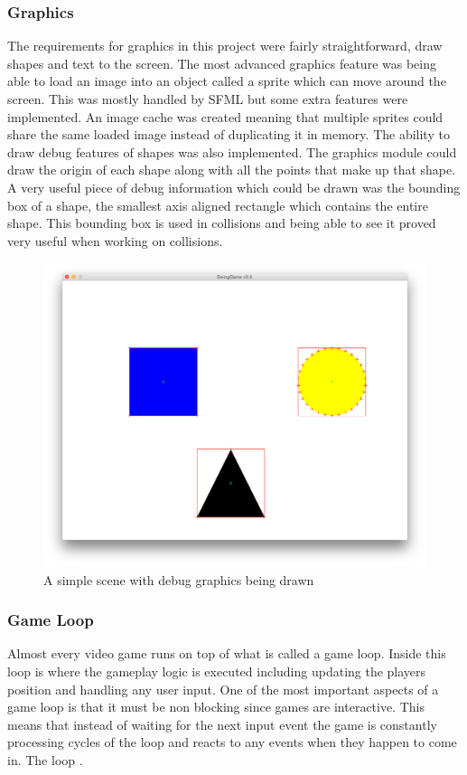 \documentclass[]{report}
\begin{document}
			\subsubsection{Graphics}
			The requirements for graphics in this project were fairly straightforward, draw shapes and text to the screen. The most advanced graphics feature was being able to load an image into an object called a sprite which can move around the screen. This was mostly handled by SFML but some extra features were implemented. An image cache was created meaning that multiple sprites could share the same loaded image instead of duplicating it in memory. The ability to draw debug features of shapes was also implemented. The graphics module could draw the origin of each shape along with all the points that make up that shape. A very useful piece of debug information which could be drawn was the bounding box of a shape, the smallest axis aligned rectangle which contains the entire shape. This bounding box is used in collisions and being able to see it proved very useful when working on collisions.
			\begin{figure}[H]
				\centering
				\includegraphics[scale=0.25]{debuggraphics}
				\caption{A simple scene with debug graphics being drawn}
				\label{debuggraphics}
			\end{figure}
			
			\subsubsection{Game Loop}
			Almost every video game runs on top of what is called a game loop. Inside this loop is where the gameplay logic is executed including updating the players position and handling any user input. One of the most important aspects of a game loop is that it must be non blocking since games are interactive. This means that instead of waiting for the next input event the game is constantly processing cycles of the loop and reacts to any events when they happen to come in. The loop \cite{gamepatterns}.
			
\end{document}
